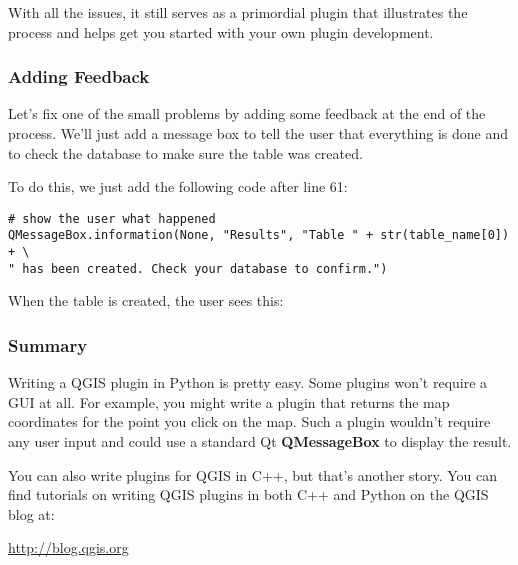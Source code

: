 With all the issues, it still serves as a primordial plugin that illustrates the process and helps get you started with your own plugin development.

\subsubsection{Adding Feedback}

Let's fix one of the small problems by adding some feedback at the end of the process.
We'll just add a message box to tell the user that everything is done and to check the database to make sure the table was created.

To do this, we just add the following code after line 61:

\begin{verbatim}
# show the user what happened
QMessageBox.information(None, "Results", "Table " + str(table_name[0]) + \
" has been created. Check your database to confirm.")
\end{verbatim}

When the table is created, the user sees this:


\subsubsection{Summary}
Writing a QGIS plugin in Python is pretty easy.
Some plugins won't require a GUI at all.
For example, you might write a plugin that returns the map coordinates for the point you click on the map.
Such a plugin wouldn't require any user input and could use a standard Qt \textbf{QMessageBox} to display the result.

You can also write plugins for QGIS in C++, but that's another story.
You can find tutorials on writing QGIS plugins in both C++ and Python on the QGIS blog at:

\begin{center}
  \url{http://blog.qgis.org} 
\end{center}